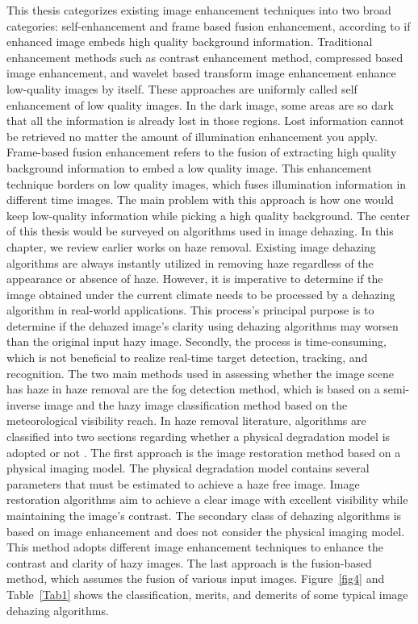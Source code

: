 \documentclass[doctor,english,listoffigures,listoftables]{thesis-uestc}
\begin{document}
This thesis categorizes existing image enhancement techniques into two broad categories: self-enhancement and frame based fusion enhancement, according to if enhanced image embeds high quality background information. Traditional enhancement methods such as contrast enhancement method, compressed based image enhancement, and wavelet based transform image enhancement enhance low-quality images by itself. These approaches are uniformly called self enhancement of low quality images. In the dark image, some areas are so dark that all the information is already lost in those regions. Lost information cannot be retrieved no matter the amount of illumination enhancement you apply. Frame-based fusion enhancement refers to the fusion of extracting high quality background information to embed a low quality image. This enhancement technique borders on low quality images, which fuses illumination information in different time images. The main problem with this approach is how one would keep low-quality information while picking a high quality background. The center of this thesis would be surveyed on algorithms used in image dehazing.
In this chapter, we review earlier works on haze removal. Existing image dehazing algorithms are always instantly utilized in removing haze regardless of the appearance or absence of haze. However, it is imperative to determine if the image obtained under the current climate needs to be processed by a dehazing algorithm in real-world applications. This process's principal purpose is to determine if the dehazed image's clarity using dehazing algorithms may worsen than the original input hazy image. Secondly, the process is time-consuming, which is not beneficial to realize real-time target detection, tracking, and recognition. The two main methods used in assessing whether the image scene has haze in haze removal are the fog detection method, which is based on a semi-inverse image and the hazy image classification method based on the meteorological visibility reach. In haze removal literature, algorithms are classified into two sections regarding whether a physical degradation model is adopted or not . The first approach is the image restoration method based on a physical imaging model. The physical degradation model contains several parameters that must be estimated to achieve a haze free image. Image restoration algorithms aim to achieve a clear image with excellent visibility while maintaining the image's contrast. The secondary class of dehazing algorithms is based on image enhancement and does not consider the physical imaging model. This method adopts different image enhancement techniques to enhance the contrast and clarity of hazy images. The last approach is the fusion-based method, which assumes the fusion of various input images. Figure~\ref{fig4} and Table~\ref{Tab1} shows the classification, merits, and demerits of some typical image dehazing algorithms. 
\end{document}
